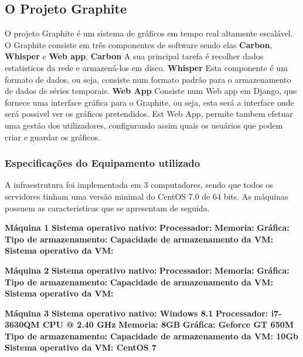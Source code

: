 \subsection{O Projeto Graphite}

O projeto Graphite é um sistema de gráficos em tempo real altamente escalável. O Graphite consiste em três componentes de software sendo elas \textbf{Carbon}, \textbf{Whisper} e \textbf{Web app}.
\textbf{Carbon} A sua principal tarefa é recolher dados estatisticos da rede e armazená-los em disco.
\textbf{Whisper} Esta componente é um formato de dados, ou seja, consiste num formato padrão para o armazenamento de dados de séries temporais.
\textbf{Web App} Consiste num Web app em Django, que fornece uma interface gráfica para o Graphite, ou seja, esta será a interface onde será possivel ver os gráficos pretendidos. Est Web App, permite tambem efetuar uma gestão dos utilizadores, configurando assim quais os usuários que podem criar e guardar os gráficos.

\subsubsection{Especificações do Equipamento utilizado}

A infraestrutura foi implementada em 3 computadores, sendo que todos os servidores tinham uma versão minimal do CentOS 7.0 de 64 bits. As máquinas possuem as caracteristicas que se apresentam de seguida.

\textbf{Máquina 1}
\textbf{Sistema operativo nativo:} \textit{}
\textbf{Processador:} \textit{}
\textbf{Memoria:} \textit{}
\textbf{Gráfica:} \textit{}
\textbf{Tipo de armazenamento:} \textit{}
\textbf{Capacidade de armazenamento da VM:} \textit{}
\textbf{Sistema operativo da VM:} \textit{}

\textbf{Máquina 2}
\textbf{Sistema operativo nativo:} \textit{}
\textbf{Processador:} \textit{}
\textbf{Memoria:} \textit{}
\textbf{Gráfica:} \textit{}
\textbf{Tipo de armazenamento:} \textit{}
\textbf{Capacidade de armazenamento da VM:} \textit{}
\textbf{Sistema operativo da VM:} \textit{}

\textbf{Máquina 3}
\textbf{Sistema operativo nativo: Windows 8.1} \textit{}
\textbf{Processador: i7-3630QM CPU @ 2.40 GHz} \textit{}
\textbf{Memoria: 8GB} \textit{}
\textbf{Gráfica: Geforce GT 650M} \textit{}
\textbf{Tipo de armazenamento:} \textit{}
\textbf{Capacidade de armazenamento da VM: 10Gb} \textit{}
\textbf{Sistema operativo da VM: CentOS 7} \textit{}
